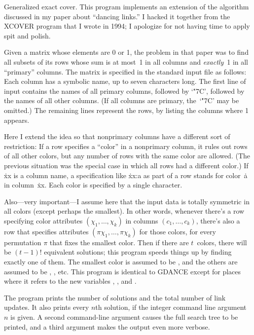 
\datethis

Generalized exact cover.
This program implements an extension of
the algorithm discussed in my paper about ``dancing
links.'' I hacked it together from the {\mc XCOVER} program that I wrote in
1994; I apologize for not having time to apply spit and polish.

Given a matrix whose elements are 0 or 1, the problem in that paper was to
find all subsets of its rows whose sum is at most~1 in all columns and
{\it exactly\/}~1 in all ``primary'' columns. The matrix is specified
in the standard input file as follows: Each column has a symbolic name,
up to seven characters long. The first line of input contains
the names of all primary columns, followed by `\.{\char"7C}', followed by
the names of all other columns.
(If all columns are primary, the~`\.{\char"7C}' may be omitted.)
The remaining lines represent the rows, by listing the columns where 1 appears.

Here I extend the idea so that nonprimary columns have a different sort
of restriction: If a row specifies a ``color'' in a nonprimary column,
it rules out rows of all other colors, but any number of rows with the
same color are allowed. (The previous situation was the special case
in which all rows had a different color.)
If \.{xx} is a column name, a specification like \.{xx:a} as part of a row
stands for color~\.a in column~\.{xx}. Each color is specified by a
single character.

Also---very important---I assume here that the input data is totally
symmetric in all colors (except perhaps the smallest). In other words,
whenever there's a row specifying color attributes $(\chi_1,\ldots,\chi_k)$
in columns $(c_1,\ldots,c_k)$, there's also a row that specifies
attributes $(\pi\chi_1,\ldots,\pi\chi_k)$ for those colors, for every
permutation $\pi$ that fixes the smallest color. Then if there are
$t$~colors, there will be $(t-1)!$ equivalent solutions; this program
speeds things up by finding exactly one of them.
The smallest color is assumed to be ,
and the others are assumed to be , , etc.
This program is identical to {\mc GDANCE} except for places where
it refers to the new variables , , and %
.

The program prints the number of solutions and the total number of link
updates. It also prints every $n$th solution, if the integer command
line argument $n$ is given. A second command-line argument causes the
full search tree to be printed, and a third argument makes the output
even more verbose.

